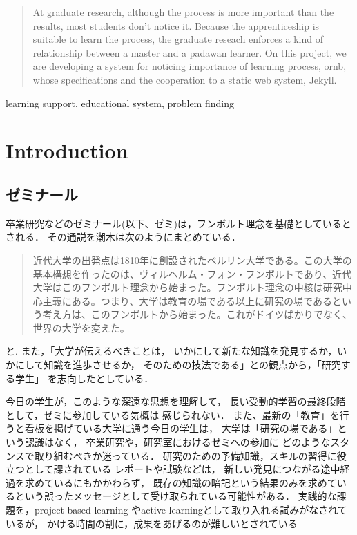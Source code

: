 \documentclass{hissymp}
\author{bob}
\date{}
\begin{document}
\begin{abstract}
\label{sec:org29ee7f0}
At graduate research,
although the process is more important than the results,
most students don't notice it.
Because the apprenticeship is suitable to learn the process,
the graduate reseach enforces a kind of
relationship between
a master and a padawan learner.
On this project,
we are developing a system for
noticing importance of learning process,
ornb, whose specifications and
the cooperation to a static web system, Jekyll.

\end{abstract}

\begin{keyword}
learning support, educational system, problem finding
\end{keyword}

\maketitle
\section{Introduction}

\label{sec:orgd678562}
\subsection{ゼミナール}
\label{sec:org48ea560}
卒業研究などのゼミナール(以下、ゼミ)は，フンボルト理念を基礎としているとされる．
その通説を潮木は次のようにまとめている．
\begin{quote}
近代大学の出発点は1810年に創設されたベルリン大学である。この大学の基本構想を作ったのは、ヴィルヘルム・フォン・フンボルトであり、近代大学はこのフンボルト理念から始まった。フンボルト理念の中核は研究中心主義にある。つまり、大学は教育の場である以上に研究の場であるという考え方は、このフンボルトから始まった。これがドイツばかりでなく、世界の大学を変えた。\cite{Ushiogi_column}
\end{quote}
と. また，「大学が伝えるべきことは，
いかにして新たな知識を発見するか，いかにして知識を進歩させるか，
そのための技法である」との観点から，「研究する学生」
を志向したとしている\cite{Ushiogi}．

今日の学生が，このような深遠な思想を理解して，
長い受動的学習の最終段階として，ゼミに参加している気概は
感じられない．
また、最新の「教育」を行うと看板を掲げている大学に通う今日の学生は，
大学は「研究の場である」という認識はなく，
卒業研究や，研究室におけるゼミへの参加に
どのようなスタンスで取り組むべきか迷っている．
研究のための予備知識，スキルの習得に役立つとして課されている
レポートや試験などは，
新しい発見につながる途中経過を求めているにもかかわらず，
既存の知識の暗記という結果のみを求めているという誤ったメッセージとして受け取られている可能性がある．
実践的な課題を，project based learning \cite{Bell}
やactive learningとして取り入れる試みがなされているが\cite{Settles,溝上}，
かける時間の割に，成果をあげるのが難しいとされている
\end{document}
